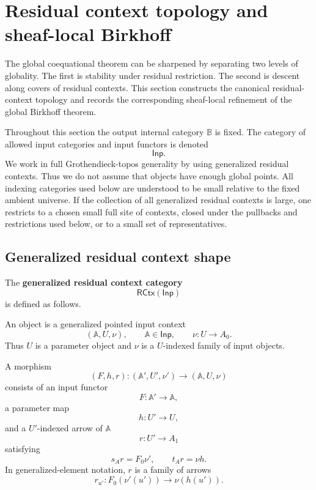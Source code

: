 \section{Residual context topology and sheaf-local Birkhoff}
\label{sec:residual-context-topology}

The global coequational theorem can be sharpened by separating two levels of
globality. The first is stability under residual restriction. The second is
descent along covers of residual contexts. This section constructs the
canonical residual-context topology and records the corresponding sheaf-local
refinement of the global Birkhoff theorem.

Throughout this section the output internal category \(\mathbb B\) is fixed.
The category of allowed input categories and input functors is denoted
\[
    \mathsf{Inp}.
\]
We work in full Grothendieck-topos generality by using generalized residual
contexts. Thus we do not assume that objects have enough global points. All
indexing categories used below are understood to be small relative to the fixed
ambient universe. If the collection of all generalized residual contexts is
large, one restricts to a chosen small full site of contexts, closed under the
pullbacks and restrictions used below, or to a small set of representatives.

\subsection{Generalized residual context shape}
\label{subsec:generalized-residual-context-shape}

\begin{definition}
\label{def:generalized-residual-context-category}
    The \textbf{generalized residual context category}
    \[
        \mathsf{RCtx}(\mathsf{Inp})
    \]
    is defined as follows.

    An object is a generalized pointed input context
    \[
        (\mathbb A,U,\nu),
        \qquad
        \mathbb A\in\mathsf{Inp},
        \qquad
        \nu:U\to A_0.
    \]
    Thus \(U\) is a parameter object and \(\nu\) is a \(U\)-indexed family of
    input objects.

    A morphism
    \[
        (F,h,r):
        (\mathbb A',U',\nu')
        \longrightarrow
        (\mathbb A,U,\nu)
    \]
    consists of an input functor
    \[
        F:\mathbb A'\to\mathbb A,
    \]
    a parameter map
    \[
        h:U'\to U,
    \]
    and a \(U'\)-indexed arrow of \(\mathbb A\)
    \[
        r:U'\to A_1
    \]
    satisfying
    \[
        s_A r=F_0\nu',
        \qquad
        t_A r=\nu h.
    \]
    In generalized-element notation, \(r\) is a family of arrows
    \[
        r_{u'}:F_0(\nu'(u'))\to \nu(h(u')).
    \]
\end{definition}

